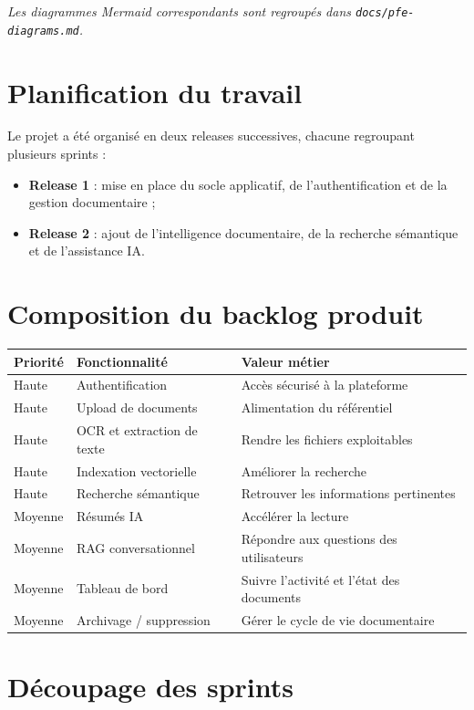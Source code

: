 \documentclass[12pt,a4paper]{report}
\begin{document}
\textit{Les diagrammes Mermaid correspondants sont regroupés dans \texttt{docs/pfe-diagrams.md}.}

\section{Planification du travail}
Le projet a été organisé en deux releases successives, chacune regroupant plusieurs sprints :
\begin{itemize}
  \item \textbf{Release 1} : mise en place du socle applicatif, de l'authentification et de la gestion documentaire ;
  \item \textbf{Release 2} : ajout de l'intelligence documentaire, de la recherche sémantique et de l'assistance IA.
\end{itemize}

\section{Composition du backlog produit}

\begin{longtable}{>{\raggedright\arraybackslash}p{2.3cm} >{\raggedright\arraybackslash}p{6.2cm} >{\raggedright\arraybackslash}p{5.0cm}}
\toprule
Priorit\'e & Fonctionnalit\'e & Valeur m\'etier \\
\midrule
Haute & Authentification & Accès sécurisé à la plateforme \\
Haute & Upload de documents & Alimentation du référentiel \\
Haute & OCR et extraction de texte & Rendre les fichiers exploitables \\
Haute & Indexation vectorielle & Améliorer la recherche \\
Haute & Recherche sémantique & Retrouver les informations pertinentes \\
Moyenne & Résumés IA & Accélérer la lecture \\
Moyenne & RAG conversationnel & Répondre aux questions des utilisateurs \\
Moyenne & Tableau de bord & Suivre l'activité et l'état des documents \\
Moyenne & Archivage / suppression & Gérer le cycle de vie documentaire \\
\bottomrule
\end{longtable}

\section{Découpage des sprints}
\end{document}
